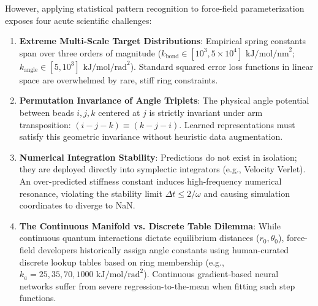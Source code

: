 \documentclass[10pt,journal,compsoc]{IEEEtran}
\begin{document}
However, applying statistical pattern recognition to force-field parameterization exposes four acute scientific challenges:
\begin{enumerate}
    \item \textbf{Extreme Multi-Scale Target Distributions}: Empirical spring constants span over three orders of magnitude ($k_{\text{bond}} \in [10^3, 5\times 10^4]\text{ kJ/mol/nm}^2$; $k_{\text{angle}} \in [5, 10^3]\text{ kJ/mol/rad}^2$). Standard squared error loss functions in linear space are overwhelmed by rare, stiff ring constraints.
    \item \textbf{Permutation Invariance of Angle Triplets}: The physical angle potential between beads $i, j, k$ centered at $j$ is strictly invariant under arm transposition: $(i-j-k) \equiv (k-j-i)$. Learned representations must satisfy this geometric invariance without heuristic data augmentation.
    \item \textbf{Numerical Integration Stability}: Predictions do not exist in isolation; they are deployed directly into symplectic integrators (e.g., Velocity Verlet). An over-predicted stiffness constant induces high-frequency numerical resonance, violating the stability limit $\Delta t \le 2/\omega$ and causing simulation coordinates to diverge to NaN.
    \item \textbf{The Continuous Manifold vs. Discrete Table Dilemma}: While continuous quantum interactions dictate equilibrium distances ($r_0, \theta_0$), force-field developers historically assign angle constants using human-curated discrete lookup tables based on ring membership (e.g., $k_a = 25, 35, 70, 1000\text{ kJ/mol/rad}^2$). Continuous gradient-based neural networks suffer from severe regression-to-the-mean when fitting such step functions.
\end{enumerate}
\end{document}

